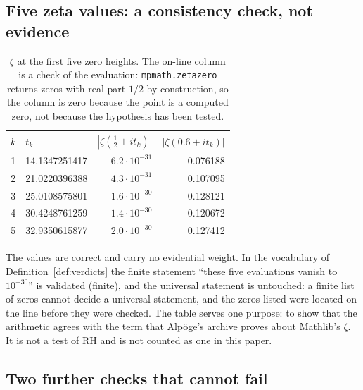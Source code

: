 \documentclass[11pt,a4paper]{article}
\newcommand{\RH}{\mathrm{RH}}
\newcommand{\verdict}[1]{\textsf{#1}}
\begin{document}
\subsection{Five zeta values: a consistency check, not evidence}

\begin{table}[htbp]
\centering
\caption{$\zeta$ at the first five zero heights. The on-line column is a check of the
evaluation: \texttt{mpmath.zetazero} returns zeros with real part $1/2$ by construction, so
the column is zero because the point is a computed zero, not because the hypothesis has been
tested.}
\label{tab:zeta}
\footnotesize
\begin{tabular}{@{}rlrr@{}}
\toprule
$k$ & $t_k$ & $|\zeta(\tfrac12+it_k)|$ & $|\zeta(0.6+it_k)|$ \\
\midrule
1 & 14.1347251417 & $6.2\cdot10^{-31}$ & 0.076188 \\
2 & 21.0220396388 & $4.3\cdot10^{-31}$ & 0.107095 \\
3 & 25.0108575801 & $1.6\cdot10^{-30}$ & 0.128121 \\
4 & 30.4248761259 & $1.4\cdot10^{-30}$ & 0.120672 \\
5 & 32.9350615877 & $2.0\cdot10^{-30}$ & 0.127412 \\
\bottomrule
\end{tabular}
\end{table}

The values are correct and carry no evidential weight. In the vocabulary of
Definition~\ref{def:verdicts} the finite statement ``these five evaluations vanish to
$10^{-30}$'' is \verdict{validated (finite)}, and the universal statement is untouched: a finite
list of zeros cannot decide a universal statement, and the zeros listed were located on the line
before they were checked. The table serves one purpose: to show that the arithmetic agrees with the
term that Alp\"oge's archive proves about Mathlib's $\zeta$. It is not a test of $\RH$ and is not
counted as one in this paper.

\subsection{Two further checks that cannot fail}
\end{document}
